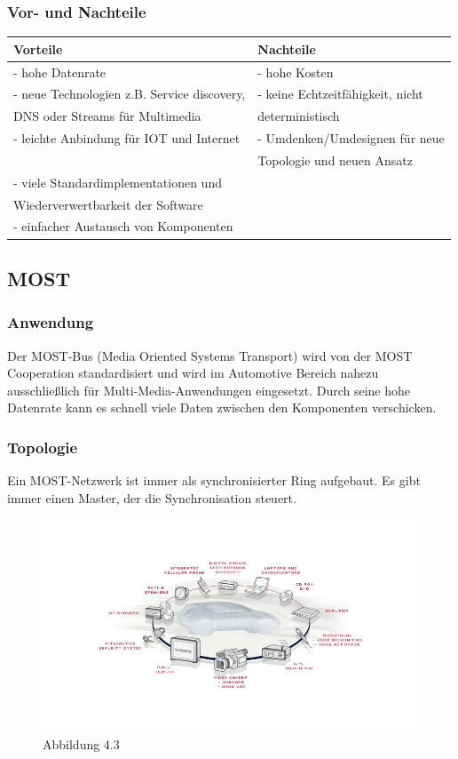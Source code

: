 \subsubsection{Vor- und Nachteile}
\begin{tabular}{l | l}
	Vorteile & Nachteile\\
	\hline - hohe Datenrate & - hohe Kosten\\
	\hline - neue Technologien z.B. Service discovery,  & - keine Echtzeitfähigkeit, nicht\\
	DNS oder Streams für Multimedia & deterministisch\\
	\hline - leichte Anbindung für IOT und Internet & - Umdenken/Umdesignen für neue \\
	& Topologie und neuen Ansatz\\
	\hline - viele Standardimplementationen und&\\
	Wiederverwertbarkeit der Software&\\
	\hline - einfacher Austausch von Komponenten &\\
	

\end{tabular}

\subsection{MOST}		
\subsubsection{Anwendung}
Der MOST-Bus (Media Oriented Systems Transport) wird von der MOST Cooperation standardisiert und wird im Automotive Bereich nahezu ausschließlich für Multi-Media-Anwendungen eingesetzt. Durch seine hohe Datenrate kann es schnell viele Daten zwischen den Komponenten verschicken.


\subsubsection{Topologie}
Ein MOST-Netzwerk ist immer als synchronisierter Ring aufgebaut. Es gibt immer einen Master, der die Synchronisation steuert.


\begin{figure}[h!]
	\includegraphics[width=\linewidth]{most_ring.jpg}
	\caption{Abbildung 4.3}
\end{figure}

